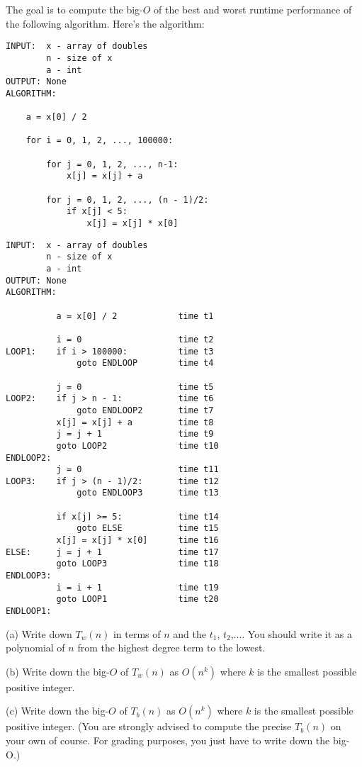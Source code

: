 The goal is to compute the big-$O$ of the best and worst runtime performance
of the following algorithm. 
Here's the algorithm:
\begin{Verbatim}[frame=single]
INPUT:  x - array of doubles
        n - size of x
        a - int
OUTPUT: None
ALGORITHM:

    a = x[0] / 2                           

    for i = 0, 1, 2, ..., 100000:

        for j = 0, 1, 2, ..., n-1:
            x[j] = x[j] + a                

        for j = 0, 1, 2, ..., (n - 1)/2:
            if x[j] < 5:                   
                x[j] = x[j] * x[0]         

\end{Verbatim}

\begin{Verbatim}[frame=single]
INPUT:  x - array of doubles
        n - size of x
        a - int
OUTPUT: None
ALGORITHM:

          a = x[0] / 2            time t1

          i = 0                   time t2           
LOOP1:    if i > 100000:          time t3
              goto ENDLOOP        time t4

          j = 0                   time t5
LOOP2:    if j > n - 1:           time t6
              goto ENDLOOP2       time t7
          x[j] = x[j] + a         time t8
          j = j + 1               time t9
          goto LOOP2              time t10
ENDLOOP2:
          j = 0                   time t11
LOOP3:    if j > (n - 1)/2:       time t12
              goto ENDLOOP3       time t13

          if x[j] >= 5:           time t14
              goto ELSE           time t15
          x[j] = x[j] * x[0]      time t16
ELSE:     j = j + 1               time t17
          goto LOOP3              time t18
ENDLOOP3:
          i = i + 1               time t19
          goto LOOP1              time t20
ENDLOOP1:
\end{Verbatim}


(a) Write down $T_w(n)$ in terms of $n$ and the $t_1$, $t_2$,....
You should write it as a polynomial of $n$ from the highest
degree term to the lowest.

(b) Write down the big-$O$ of $T_w(n)$ as $O(n^k)$
where $k$ is the smallest possible  positive integer.

(c) Write down the big-$O$ of $T_b(n)$ as
$O(n^k)$
where $k$ is the smallest possible  positive integer.
(You are strongly advised to compute the
 precise $T_b(n)$ on your own of course.
For grading purposes, you just have to write down the big-O.)


